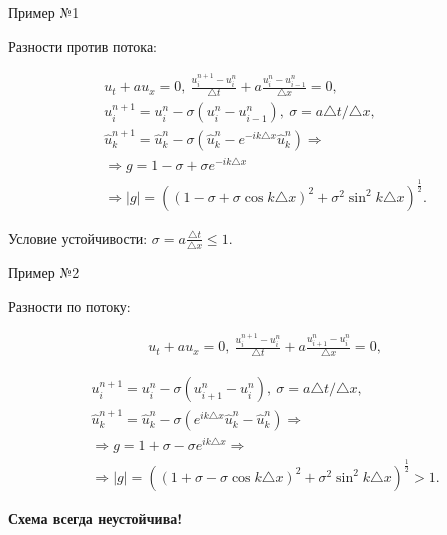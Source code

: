 \documentclass[12pt,xcolor=pst,aspectratio=169]{beamer}
\begin{document}
\begin{frame}{Пример №1}

	\transdissolve[duration=0.1]
	\justifying
	\large

	Разности против потока:

	\[
		\begin{split}
			&u_{t} + a u_{x} = 0 , \: \frac{u^{n + 1}_{i} - u^{n}_{i}}{\triangle t} + a \frac{u^{n}_{i} - u^{n}_{i - 1}}{\triangle x} = 0 , \\
			&u^{n + 1}_{i} = u^{n}_{i} - \sigma \left( u^{n}_{i} - u^{n}_{i - 1} \right) , \: \sigma = a \triangle t / \triangle x , \\
			&\hat{u}^{n + 1}_{k} = \hat{u}^{n}_{k} - \sigma \left( \hat{u}^{n}_{k} - e^{- i k \triangle x} \hat{u}^{n}_{k} \right) \Rightarrow \\
			& \Rightarrow g = 1 - \sigma + \sigma e^{- i k \triangle x} \\
			& \Rightarrow |g| = \left( \left( 1 - \sigma + \sigma \cos k \triangle x \right)^{2} + \sigma^2 \sin^{2} k \triangle x \right)^{\frac{1}{2}}.
		\end{split}
	\]

    Условие устойчивости: $\sigma = a \frac{\triangle t}{\triangle x} \leq 1$.\\

\end{frame}

\begin{frame}{Пример №2}

	\transdissolve[duration=0.1]
	\justifying
	\large

	Разности по потоку:

	\[
		\begin{split}
			&u_{t} + a u_{x} = 0 , \: \frac{u^{n + 1}_{i} - u^{n}_{i}}{\triangle t} + a \frac{u^{n}_{i + 1} - u^{n}_{i}}{\triangle x} = 0,
		\end{split}
	\]

	\pause

	\[
		\begin{split}
			&u^{n + 1}_{i} = u^{n}_{i} - \sigma \left( u^{n}_{i + 1} - u^{n}_{i} \right), \: \sigma = a \triangle t / \triangle x, \\
			&\hat{u}^{n + 1}_{k} = \hat{u}^{n}_{k} - \sigma \left( e^{i k \triangle x} \hat{u}^{n}_{k} - \hat{u}^{n}_{k} \right) \Rightarrow \\
			& \Rightarrow g = 1 + \sigma - \sigma e^{i k \triangle x} \Rightarrow \\
			&\Rightarrow |g| = \left( \left( 1 + \sigma - \sigma \cos k \triangle x \right)^{2} + \sigma^2 \sin^{2} k \triangle x \right)^{\frac{1}{2}} > 1 .
		\end{split}
	\]

    \textbf{Схема всегда неустойчива!}\\

\end{frame}
\end{document}
